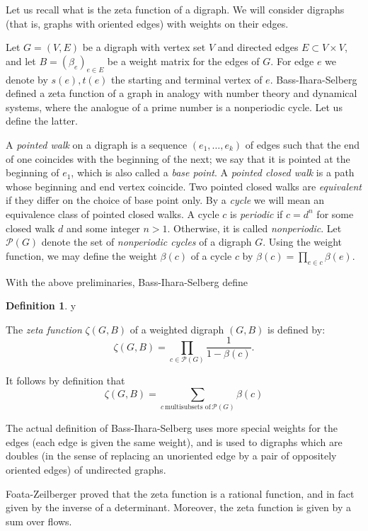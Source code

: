 \documentclass{amsart}
\theoremstyle{plain}
\theoremstyle{definition}
\newtheorem{definition}[proposition]{Definition}
\theoremstyle{remark}
\def\printname#1{
        \if\draft y
                \smash{\makebox[0pt]{\hspace{-0.5in}
                        \raisebox{8pt}{\tt\tiny #1}}}
        \fi
}
\def\lbl#1{\label{#1}\printname{#1}}
\def\P{\mathcal P}
\def\b{\beta}
\begin{document}
Let us recall what is the zeta function of a digraph. We will consider
digraphs (that is, graphs with oriented edges) with weights on their edges.

Let $G=(V,E)$ be a digraph with vertex set $V$ and directed edges $E \subset
V \times V$, and let $B=(\b_e)_{e\in E}$ be a weight matrix for the edges of 
$G$.
For edge $e$ we denote by $s(e), t(e)$ the starting and terminal vertex of $e$.
Bass-Ihara-Selberg defined
a zeta function of a graph in analogy with number theory and dynamical
systems, where the analogue of a prime number is a nonperiodic cycle.
Let us define the latter.

A {\em pointed walk} on a digraph is a 
sequence $(e_1, \dots, e_k)$ of edges such that the end of one coincides with 
the beginning of the next; we say that it is pointed at the beginning of $e_1$,
which is also called a {\em base point}. A {\em pointed closed walk} 
is a path whose beginning and end vertex coincide. 
Two pointed closed walks are {\em equivalent} if they differ on the choice
of base point only. By a {\em cycle} we will mean an equivalence class 
of pointed closed walks. A  cycle $c$ is {\em periodic} if $c=d^n$ for 
some closed walk $d$ and some integer $n>1$. Otherwise, it is called
{\em nonperiodic}. Let $\P(G)$ denote the set of {\em nonperiodic cycles}
of a digraph $G$. Using the weight function, we may define the weight $\b(c)$
of a cycle $c$ by $\b(c)= \prod_{e\in c}\b(e)$.

With the above preliminaries, Bass-Ihara-Selberg \cite{B} define

\begin{definition}
\lbl{def.zeta}
The {\em zeta function} $\zeta(G,B)$ of a weighted digraph $(G,B)$ is defined
by:
$$
\zeta(G,B)=\prod_{c \in \P(G)} \frac{1}{1-\b(c)}.
$$
\end{definition}

It follows by definition that
$$
\zeta(G,B)= \sum_{c \, \text{multisubsets of} \, \P(G)} \b(c)
$$

The actual definition of Bass-Ihara-Selberg uses more special
weights for the edges (each edge is given the same weight), and is used
to digraphs which are doubles (in the sense of replacing an unoriented edge
by a pair of oppositely oriented edges) of undirected graphs.
 
Foata-Zeilberger proved that the zeta function is a
rational function, and in fact given by the inverse of a determinant. Moreover,
the zeta function is given by a sum over flows. 
\end{document}
